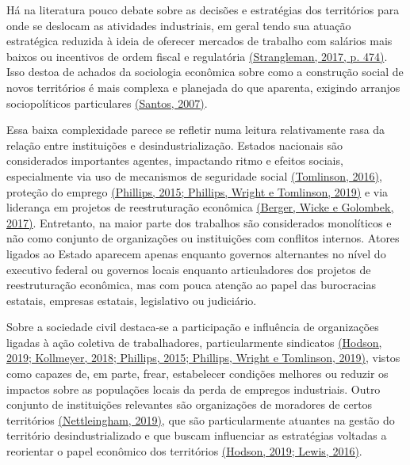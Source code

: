 Há na literatura pouco debate sobre as decisões e estratégias dos
territórios para onde se deslocam as atividades industriais, em geral
tendo sua atuação estratégica reduzida à ideia de oferecer mercados de
trabalho com salários mais baixos ou incentivos de ordem fiscal e
regulatória
\href{https://www.zotero.org/google-docs/?7TG9zQ}{(Strangleman, 2017, p.
474)}. Isso destoa de achados da sociologia econômica sobre como a
construção social de novos territórios é mais complexa e planejada do
que aparenta, exigindo arranjos sociopolíticos particulares
\href{https://www.zotero.org/google-docs/?FEwbWu}{(Santos, 2007)}.

Essa baixa complexidade parece se refletir numa leitura relativamente
rasa da relação entre instituições e desindustrialização. Estados
nacionais são considerados importantes agentes, impactando ritmo e
efeitos sociais, especialmente via uso de mecanismos de seguridade
social \href{https://www.zotero.org/google-docs/?8dvTLj}{(Tomlinson,
2016)}, proteção do emprego
\href{https://www.zotero.org/google-docs/?OZsxYI}{(Phillips, 2015;
Phillips, Wright e Tomlinson, 2019)} e via liderança em projetos de
reestruturação econômica
\href{https://www.zotero.org/google-docs/?14S3Qj}{(Berger, Wicke e
Golombek, 2017)}. Entretanto, na maior parte dos trabalhos são
considerados monolíticos e não como conjunto de organizações ou
instituições com conflitos internos. Atores ligados ao Estado aparecem
apenas enquanto governos alternantes no nível do executivo federal ou
governos locais enquanto articuladores dos projetos de reestruturação
econômica, mas com pouca atenção ao papel das burocracias estatais,
empresas estatais, legislativo ou judiciário.

Sobre a sociedade civil destaca-se a participação e influência de
organizações ligadas à ação coletiva de trabalhadores, particularmente
sindicatos \href{https://www.zotero.org/google-docs/?nGvPUZ}{(Hodson,
2019; Kollmeyer, 2018; Phillips, 2015; Phillips, Wright e Tomlinson,
2019)}, vistos como capazes de, em parte, frear, estabelecer condições
melhores ou reduzir os impactos sobre as populações locais da perda de
empregos industriais. Outro conjunto de instituições relevantes são
organizações de moradores de certos territórios
\href{https://www.zotero.org/google-docs/?qfHjCP}{(Nettleingham, 2019)},
que são particularmente atuantes na gestão do território
desindustrializado e que buscam influenciar as estratégias voltadas a
reorientar o papel econômico dos territórios
\href{https://www.zotero.org/google-docs/?XYaD25}{(Hodson, 2019; Lewis,
2016)}.


